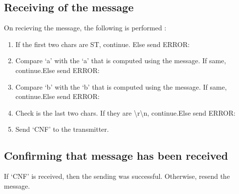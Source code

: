 \documentclass [a4paper,11pt]{article}
\begin{document}
\subsection{Receiving of the message}
On recieving the message, the following is performed :
\begin{enumerate}
\item If the first two chars are ST, continue. Else send ERROR:
\item Compare `a' with the `a' that is computed using the message. If same, continue.Else send ERROR:
\item Compare `b' with the `b' that is computed using the message. If same, continue.Else send ERROR:
\item Check is the last two chars. If they are {\textbackslash}r{\textbackslash}n, continue.Else send ERROR:
\item Send `CNF' to the transmitter.
\end{enumerate}
\subsection{Confirming that message has been received}
If `CNF' is received, then the sending was successful. Otherwise, resend the message.
\end{document}
